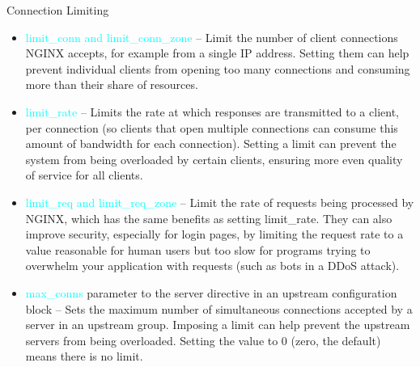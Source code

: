 \documentclass{beamer}
\begin{document}
\begin{frame}{Connection Limiting}
\scriptsize

\begin{itemize}
	\item \textcolor{cyan}{limit\_conn and limit\_conn\_zone} – Limit the number of client connections NGINX accepts, for example from a single IP address. Setting them can help prevent individual clients from opening too many connections and consuming more than their share of resources.
	\item \textcolor{cyan}{limit\_rate} – Limits the rate at which responses are transmitted to a client, per connection (so clients that open multiple connections can consume this amount of bandwidth for each connection). Setting a limit can prevent the system from being overloaded by certain clients, ensuring more even quality of service for all clients.
	\item \textcolor{cyan}{limit\_req and limit\_req\_zone} – Limit the rate of requests being processed by NGINX, which has the same benefits as setting limit\_rate. They can also improve security, especially for login pages, by limiting the request rate to a value reasonable for human users but too slow for programs trying to overwhelm your application with requests (such as bots in a DDoS attack).
	\item \textcolor{cyan}{max\_conns}  parameter to the server directive in an upstream configuration block – Sets the maximum number of simultaneous connections accepted by a server in an upstream group. Imposing a limit can help prevent the upstream servers from being overloaded. Setting the value to 0 (zero, the default) means there is no limit.
\end{itemize}
\end{frame}
\end{document}
